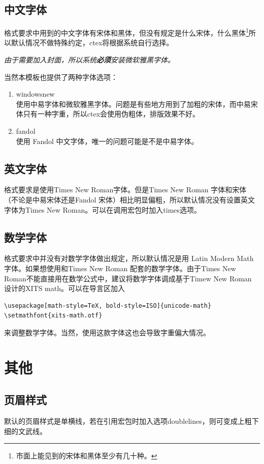 \documentclass{LZU}
\newenvironment{note}{\par\itshape\noindent{\makebox[-5pt][r]{\scriptsize\color{red!90}\textdbend\quad}}}{\par}
\newcommand{\package}[1]{{\sffamily #1}}
\begin{document}
\subsection{中文字体}
格式要求中用到的中文字体有宋体和黑体，但没有规定是什么宋体，什么黑体\footnote{市面上能见到的宋体和黑体至少有几十种。}所以默认情况不做特殊约定，\package{ctex}将根据系统自行选择。
\begin{note}
    由于需要加入封面，所以系统{\bf 必须}安装微软雅黑字体。
\end{note}

当然本模板也提供了两种字体选项：
\begin{enumerate}
    \item windowsnew\\
        使用中易字体和微软雅黑字体。问题是有些地方用到了加粗的宋体，而中易宋体只有一种字重，所以\package{ctex}会使用伪粗体，排版效果不好。
    \item fandol\\
        使用 Fandol 中文字体，唯一的问题可能是不是中易字体。
\end{enumerate}
\subsection{英文字体}
格式要求是使用Times New Roman字体。但是Times New Roman 字体和宋体（不论是中易宋体还是Fandol 宋体）相比明显偏粗，所以默认情况没有设置英文字体为Times New Roman。可以在调用宏包时加入times选项。
\subsection{数学字体}
\label{subsec:math_font}
格式要求中并没有对数学字体做出规定，所以默认情况是用 Latin Modern Math 字体。如果想使用和Times New Roman 配套的数学字体。由于Times New Roman不能直接用在数学公式中，建议将数学字体调成基于Timew New Roman 设计的XITS math。可以在导言区加入
\begin{verbatim}
\usepackage[math-style=TeX, bold-style=ISO]{unicode-math}
\setmathfont{xits-math.otf}
\end{verbatim}
来调整数学字体。当然，使用这款字体这也会导致字重偏大情况。
\section{其他}
\subsection{页眉样式}
默认的页眉样式是单横线，若在引用宏包时加入选项doublelines，则可变成上粗下细的文武线。
\end{document}
